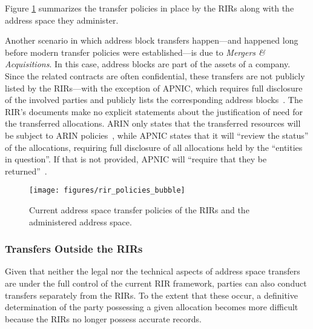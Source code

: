 \documentclass[letter]{sigcomm-alternate}
\begin{document}
Figure \ref{fig:rir_policies_bubble} summarizes the transfer policies in place 
by the RIRs along with the address space they administer.

Another scenario in which address block transfers happen---and happened long
before modern transfer policies were established---is due to \emph{Mergers
\& Acquisitions}.  In this case, address blocks are part of the assets of a
company.  Since the related contracts are often confidential, these transfers
are not publicly listed by the RIRs---with the exception of APNIC, which 
requires full disclosure of the involved parties and publicly lists the 
corresponding address blocks~\cite{apnic_transfers}. The RIR's documents make no 
explicit statements about the justification of need for the transferred 
allocations. ARIN only states that the transferred resources will be subject to 
ARIN policies~\cite{arin_manual}, while APNIC states that it will ``review the 
status'' of the allocations, requiring full disclosure of all allocations held 
by the ``entities in question''. If that is not provided, APNIC will ``require 
that they be returned''~\cite{apnic_policy}.

\begin{figure}

  \begin{center}
    \texttt{[image: figures/rir\_policies\_bubble]}
  \caption{Current address space transfer policies of the RIRs and the   
  administered address space.}
   \vspace{-2em}
  \label{fig:rir_policies_bubble}
  \end{center}
    
\end{figure} 

\subsubsection{Transfers Outside the RIRs} 
Given that neither the legal nor the technical aspects of address space
transfers are under the full control of the current RIR framework, parties can
also conduct transfers separately from the RIRs.  To the extent that these
occur, a definitive determination of the party possessing a given allocation
becomes more difficult because the RIRs no longer possess accurate
records.
\end{document}
